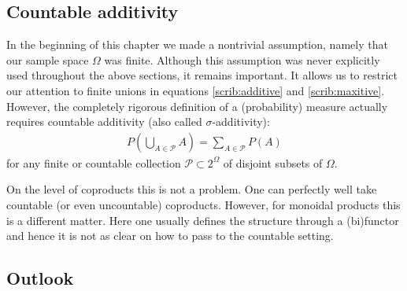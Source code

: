 \subsection{Countable additivity}

    In the beginning of this chapter we made a nontrivial assumption, namely that our sample space $\Omega$ was finite. Although this assumption was never explicitly used throughout the above sections, it remains important. It allows us to restrict our attention to finite unions in equations \ref{scrib:additive} and \ref{scrib:maxitive}. However, the completely rigorous definition of a (probability) measure actually requires countable additivity (also called  $\sigma$-additivity):
    \begin{gather}
        \label{scrib:sigma_additivity}
        P\left(\bigcup_{A\in\mathcal{P}}A\right)=\sum_{A\in\mathcal{P}}P(A)
    \end{gather}
    for any finite or countable collection $\mathcal{P}\subset2^\Omega$ of disjoint subsets of $\Omega$.

    On the level of coproducts this is not a problem. One can perfectly well take countable (or even uncountable) coproducts. However, for monoidal products this is a different matter. Here one usually defines the structure through a (bi)functor and hence it is not as clear on how to pass to the countable setting.

\subsection{Outlook}

